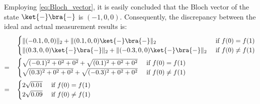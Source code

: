   Employing \autoref{eq:Bloch_vector}, it is easily concluded that the Bloch vector of the state $\ket{-} \bra{-}$ is $(-1,0,0)$. Consequently,  the discrepancy between the ideal and actual measurement results is:
  \begin{equation}
    \begin{split}
      & 
      \begin{cases}
        \lVert (-0.1,0,0) \rVert_{2} + \lVert (0.1,0,0) \ket{-} \bra{-}\rVert_{2} &\text{ if }   f(0)= f(1) \\
        \lVert(0.3,0,0)\ket{-} \bra{-}\rVert_{2} + \lVert (-0.3,0,0) \ket{-} \bra{-}\rVert_{2} &\text{ if }   f(0) \neq f(1)
      \end{cases} \\
      = \quad &
      \begin{cases}
        \sqrt{(-0.1)^{2} + 0^{2} + 0^{2}} + \sqrt{(0.1)^{2} + 0^{2} + 0^{2}} &\text{ if }   f(0)= f(1) \\
        \sqrt{(0.3)^{2} + 0^{2} + 0^{2}} + \sqrt{(-0.3)^{2} + 0^{2} + 0^{2}} &\text{ if }   f(0) \neq f(1)
      \end{cases} \\
      = \quad &
      \begin{cases}
        2 \sqrt{0.01} &\text{ if }   f(0)= f(1) \\
        2 \sqrt{0.09}  &\text{ if }   f(0) \neq f(1)
      \end{cases} \\
    \end{split}
\end{equation}


